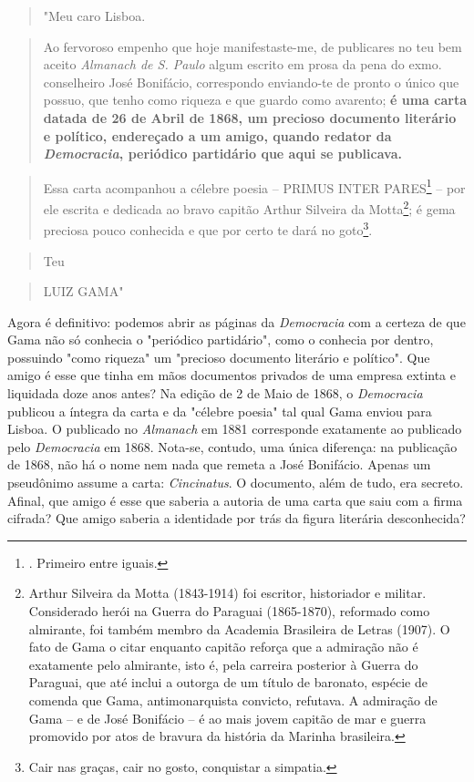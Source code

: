 \begin{quote}
"Meu caro Lisboa.
\end{quote}

\begin{quote}
Ao fervoroso empenho que hoje manifestaste-me, de publicares no teu bem
aceito \emph{Almanach de S. Paulo} algum escrito em prosa da pena do
exmo. conselheiro José Bonifácio, correspondo enviando-te de pronto o
único que possuo, que tenho como riqueza e que guardo como avarento;
\textbf{é uma carta datada de 26 de Abril de 1868, um precioso documento
literário e político, endereçado a um amigo, quando redator da
\emph{Democracia}, periódico partidário que aqui se publicava.}
\end{quote}

\begin{quote}
Essa carta acompanhou a célebre poesia -- PRIMUS INTER PARES\footnote{.
  Primeiro entre iguais.} -- por ele escrita e dedicada ao bravo capitão
Arthur Silveira da Motta\footnote{Arthur Silveira da Motta (1843-1914)
  foi escritor, historiador e militar. Considerado herói na Guerra do
  Paraguai (1865-1870), reformado como almirante, foi também membro da
  Academia Brasileira de Letras (1907). O fato de Gama o citar enquanto
  capitão reforça que a admiração não é exatamente pelo almirante, isto
  é, pela carreira posterior à Guerra do Paraguai, que até inclui a
  outorga de um título de baronato, espécie de comenda que Gama,
  antimonarquista convicto, refutava. A admiração de Gama -- e de José
  Bonifácio -- é ao mais jovem capitão de mar e guerra promovido por
  atos de bravura da história da Marinha brasileira.}; é gema preciosa
pouco conhecida e que por certo te dará no goto\footnote{Cair nas
  graças, cair no gosto, conquistar a simpatia.}.
\end{quote}

\begin{quote}
Teu
\end{quote}

\begin{quote}
LUIZ GAMA"
\end{quote}

Agora é definitivo: podemos abrir as páginas da \emph{Democracia} com a
certeza de que Gama não só conhecia o "periódico partidário", como o
conhecia por dentro, possuindo "como riqueza" um "precioso documento
literário e político". Que amigo é esse que tinha em mãos documentos
privados de uma empresa extinta e liquidada doze anos antes? Na edição
de 2 de Maio de 1868, o \emph{Democracia} publicou a íntegra da carta e
da "célebre poesia" tal qual Gama enviou para Lisboa. O publicado no
\emph{Almanach} em 1881 corresponde exatamente ao publicado pelo
\emph{Democracia} em 1868. Nota-se, contudo, uma única diferença: na
publicação de 1868, não há o nome nem nada que remeta a José Bonifácio.
Apenas um pseudônimo assume a carta: \emph{Cincinatus}. O documento,
além de tudo, era secreto. Afinal, que amigo é esse que saberia a
autoria de uma carta que saiu com a firma cifrada? Que amigo saberia a
identidade por trás da figura literária desconhecida?

